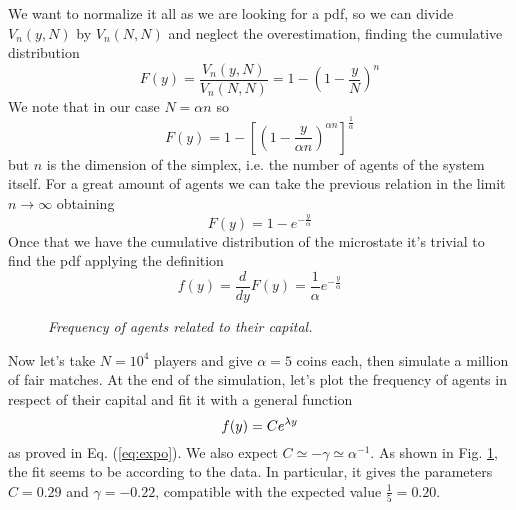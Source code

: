 We want to normalize it all as we are looking for a pdf, so we can divide $V_n\left(y, N\right)$ by $V_n\left(N, N\right)$ and neglect the overestimation, finding the cumulative distribution
\begin{equation*}
    F(y) = \frac{V_n\left(y, N\right)}{V_n\left(N, N\right)} = 1 - \left(1 - \frac{y}{N}\right)^n
\end{equation*}
We note that in our case $N=\alpha n$ so
\begin{equation*}
    F(y) =  1 - \left[\left(1 - \frac{y}{\alpha n}\right)^{\alpha n}\right]^\frac{1}{\alpha}
\end{equation*}
but $n$ is the dimension of the simplex, i.e. the number of agents of the system itself.
For a great amount of agents we can take the previous relation in the limit $n\to\infty$ obtaining
\begin{equation*}
    F(y) = 1 - e^{-\frac{y}{\alpha}}
\end{equation*}
Once that we have the cumulative distribution of the microstate it's trivial to find the pdf applying the definition
\begin{equation}
    f(y) = \frac{d}{dy}F(y) = \frac{1}{\alpha} e^{-\frac{y}{\alpha}}
    \label{eq:expo}
\end{equation}

\begin{figure}[ht!]
    \centering
    \scalebox{.7}{}
    \caption{\emph{Frequency of agents related to their capital.}}
    \label{fig:expo}
\end{figure}
Now let's take $N = 10^4$ players and give $\alpha = 5$ coins each, then simulate a million of fair matches.
At the end of the simulation, let's plot the frequency of agents in respect of their capital and fit \cite{root} it with a general function 
\begin{equation}
    f(y) = Ce^{\lambda y}
    \label{eq:generalExpo}
\end{equation}
as proved in Eq. (\ref{eq:expo}).
We  also expect $C \simeq -\gamma \simeq \alpha^{-1}$.
As shown in Fig. \ref{fig:expo}, the fit seems to be according to the data.
In particular, it gives the parameters $C = 0.29$ and $\gamma = -0.22$, compatible with the expected value $\frac{1}{5} = 0.20$.
